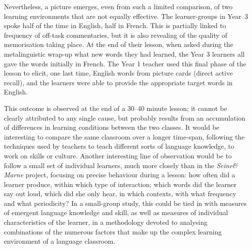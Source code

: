 \documentclass[output=paper,colorlinks,citecolor=brown,modfonts,nonflat]{../langscibook}
\begin{document}
Nevertheless, a picture emerges, even from such a limited comparison, of two learning environments that are not equally effective. The learner-groups in Year~3 spoke half of the time in English, half in French. This is partially linked to frequency of off-task commentaries, but it is also revealing of the quality of memorisation taking place. At the end of their lesson, when asked during the metalinguistic wrap-up what new words they had learned, the Year 3 learners all gave the words initially in French. The Year 1 teacher used this final phase of the lesson to elicit, one last time, English words from picture cards (direct active recall), and the learners were able to provide the appropriate target words in English.

This outcome is observed at the end of a 30--40 minute lesson; it cannot be clearly attributed to any single cause, but probably results from an accumulation of differences in learning conditions between the two classes. It would be interesting to compare the same classroom over a longer time-span, following the techniques used by teachers to teach different sorts of language knowledge, to work on skills or culture. Another interesting line of observation would be to follow a small set of individual learners, much more closely than in the \textit{Seine\& Marne} project, focusing on precise behaviour during a lesson: how often did a learner produce, within which type of interaction; which words did the learner say out loud, which did she only hear, in which contexts, with what frequency and what periodicity? In a small-group study, this could be tied in with measures of emergent language knowledge and skill, as well as measures of individual characteristics of the learner, in a methodology devoted to analysing combinations of the numerous factors that make up the complex learning environment of a language classroom.

{\sloppy\printbibliography[heading=subbibliography,notkeyword=this]}
\end{document}
